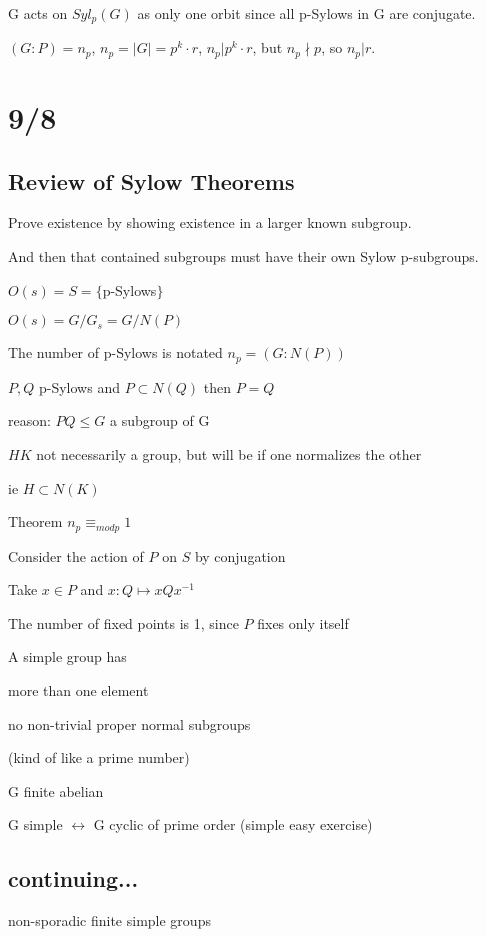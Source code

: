 \documentclass[12pt]{article}
\newcommand{\inv}{^{-1}}
\begin{document}
G acts on $Syl_p(G)$ as only one orbit since all p-Sylows in G are conjugate.

$(G : P) = n_p$, $n_p = |G| = p^k \cdot r$, $n_p | p^k \cdot r$, but $n_p \nmid p$, so $n_p | r$.

\section{9/8}

\subsection{Review of Sylow Theorems}

Prove existence by showing existence in a larger known subgroup.

And then that contained subgroups must have their own Sylow p-subgroups.

$O(s) = S = \{$p-Sylows$\}$

$O(s) = G\slash G_s = G \slash N(P)$

The number of p-Sylows is notated $n_p = (G : N(P))$

\noindent
$P, Q$ p-Sylows and $P \subset N(Q)$ then $P = Q$

reason: $PQ \leq G$ a subgroup of G

$HK$ not necessarily a group, but will be if one normalizes the other

ie $H \subset N(K)$

\noindent
Theorem $n_p \equiv_{mod p} 1$

Consider the action of $P$ on $S$ by conjugation

Take $x \in P$ and $x: Q \mapsto xQx\inv$

The number of fixed points is 1, since $P$ fixes only itself

\noindent
A simple group has

more than one element

no non-trivial proper normal subgroups

(kind of like a prime number)

\noindent
G finite abelian

G simple $\leftrightarrow$ G cyclic of prime order (simple easy exercise)

\subsection{continuing...}

\noindent
non-sporadic finite simple groups
\end{document}
